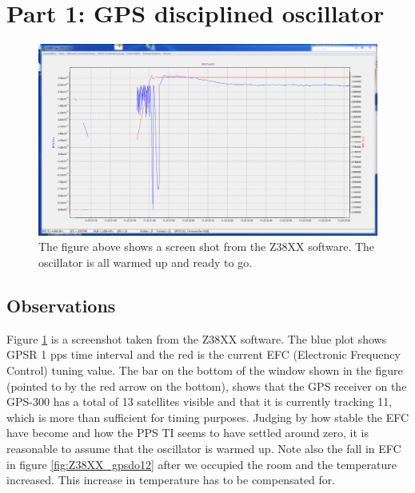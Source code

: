 \documentclass[11pt,english,a4paper]{article}
\begin{document}
\section{Part 1: GPS disciplined oscillator}
\begin{figure}[!htb]
  \centering
  \includegraphics[width=1\textwidth]{z38xx_EFC_oppstart.PNG}
  \caption[Z38XX screen shot] {The figure above shows a screen shot from the Z38XX software. The oscillator is all warmed up and ready to go.} 
  \label{fig:z38xx_oppstart}
\end{figure}

\subsection{Observations}
Figure \ref{fig:z38xx_oppstart} is a screenshot taken from the Z38XX software. The blue plot shows GPSR 1 pps time interval and the red is the current EFC (Electronic Frequency Control) tuning value. The bar on the bottom of the window shown in the figure (pointed to by the red arrow on the bottom), shows that the GPS receiver on the GPS-300 has a total of 13 satellites visible and that it is currently tracking 11, which is more than sufficient for timing purposes. Judging by how stable the EFC have become and how the PPS TI seems to have settled around zero, it is reasonable to assume that the oscillator is warmed up. Note also the fall in EFC in figure \ref{fig:Z38XX_gpsdo12} after we occupied the room and the temperature increased. This increase in temperature has to be compensated for.
\end{document}
